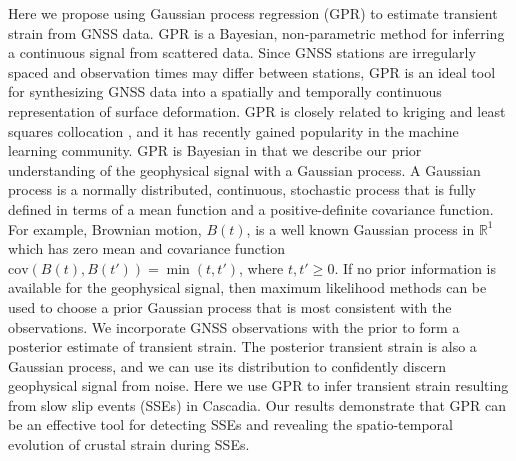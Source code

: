 \documentclass[extra,mreferee]{gji}
\begin{document}
Here we propose using Gaussian process regression (GPR) \citep{Rasmussen2006} to estimate transient strain from GNSS data. GPR is a Bayesian, non-parametric method for inferring a continuous signal from scattered data. Since GNSS stations are irregularly spaced and observation times may differ between stations, GPR is an ideal tool for synthesizing GNSS data into a spatially and temporally continuous representation of surface deformation. GPR is closely related to kriging \citep{Cressie1992} and least squares collocation \citep{Kato1998}, and it has recently gained popularity in the machine learning community. GPR is Bayesian in that we describe our prior understanding of the geophysical signal with a Gaussian process. A Gaussian process is a normally distributed, continuous, stochastic process that is fully defined in terms of a mean function and a positive-definite covariance function. For example, Brownian motion, $B(t)$, is a well known Gaussian process in $\mathbb{R}^1$ which has zero mean and covariance function $\mathrm{cov}(B(t),B(t')) = \min(t,t')$, where $t,t' \ge 0$. If no prior information is available for the geophysical signal, then maximum likelihood methods can be used to choose a prior Gaussian process that is most consistent with the observations.  We incorporate GNSS observations with the prior to form a posterior estimate of transient strain.  The posterior transient strain is also a Gaussian process, and we can use its distribution to confidently discern geophysical signal from noise. Here we use GPR to infer transient strain resulting from slow slip events (SSEs) in Cascadia. Our results demonstrate that GPR can be an effective tool for detecting SSEs and revealing the spatio-temporal evolution of crustal strain during SSEs. 
\end{document}
